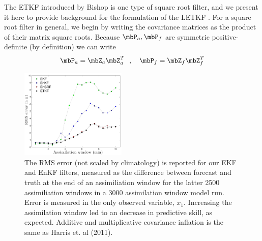 The ETKF introduced by Bishop is one type of square root filter, and we present it here to provide background for the formulation of the LETKF \cite{bishop2001adaptive}.
For a square root filter in general, we begin by writing the covariance matrices as the product of their matrix square roots.
Because $\mbP_a,\mbP_f$ are symmetric positive-definite (by definition) we can write
\begin{equation} \mbP_a = \mbZ_a \mbZ_a^T ~~,~~~ \mbP_f = \mbZ_f \mbZ_f^T \end{equation}

\begin{figure}[t]
  \centering
  \includegraphics[width=0.45\textwidth]{figures/window_experiment_plot002.pdf}
  \caption[The RMS error is reported for our EKF and EnKF filters]{
    The RMS error (not scaled by climatology) is reported for our EKF and EnKF filters, measured as the difference between forecast and truth at the end of an assimiliation window for the latter 2500 assimiliation windows in a 3000 assimilation window model run.
    Error is measured in the only observed variable, $x_1$.
    Increasing the assimilation window led to an decrease in predictive skill, as expected.
    Additive and multiplicative covariance inflation is the same as Harris et. al (2011).
  }
  \label{fig:window_test}
\end{figure}

